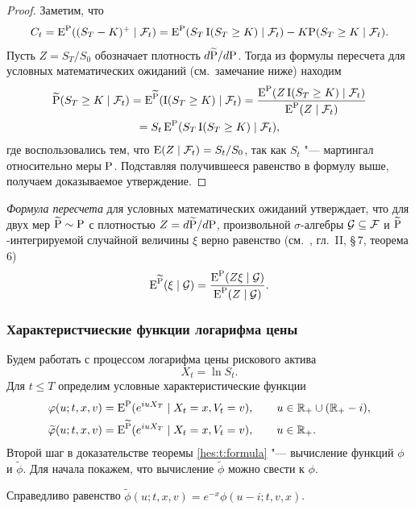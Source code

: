 \begin{proof}
Заметим, что
\[
C_t = \E^\P((S_T - K)^+\mid \F_t) = \E^\P(S_T \I(S_T\ge K) \mid \F_t) - K\P(S_T\ge K\mid \F_t).
\]
Пусть $Z = S_T/S_0$ обозначает плотность $d\tilde\P/d\P$. 
Тогда из формулы пересчета для условных математических ожиданий (см.~замечание ниже) находим
\begin{multline*}
\tilde\P(S_T\ge K\mid \F_t) = \E^{\tilde\P} (\I(S_T \ge K) \mid \F_t)
= \frac{\E^{\P}(Z \I(S_T \ge K)\mid \F_t)}{\E^{\P}(Z\mid \F_t)} \\= S_t \E^{\P}(S_T \I(S_T\ge K)\mid \F_t),
\end{multline*}
где воспользовались тем, что $\E(Z\mid \F_t) = S_t/S_0$, так как $S_t$ "--- мартингал относительно меры $\P$.
Подставляя получившееся равенство в формулу выше, получаем доказываемое утверждение.
\end{proof}

\begin{remark}
\emph{Формула пересчета} для условных математических ожиданий утверждает, что для двух мер $\tilde\P \sim \P$ с плотностью $Z=d\tilde\P/d\P$, произвольной $\sigma$-алгебры $\G\subseteq\F$ и $\tilde\P$-интегрируемой случайной величины $\xi$ верно равенство (см.~\cite{Shiryaev04}, гл.~II, \S\,7, теорема 6)
\[
\E^{\tilde \P}(\xi\mid \G) = \frac{\E^{\P}(Z\xi\mid \G)}{\E^\P(Z\mid \G)}.
\]
\end{remark}


\subsubsection{Характеристчиеские функции логарифма цены}

Будем работать с процессом логарифма цены рискового актива
\[
X_t = \ln S_t.
\]
Для $t\le T$ определим условные характеристические функции
\begin{align*}
&\phi(u; t,x,v) = \E^{\P} (e^{iu X_T} \mid X_t=x, V_t = v), \qquad u\in\R_+ \cup (\R_+-i),\\
&\tilde\phi(u; t,x,v) = \E^{\tilde\P} (e^{iu X_T} \mid X_t=x, V_t = v), \qquad u\in\R_+ .
\end{align*}
Второй шаг в доказательстве теоремы \ref{hes:t:formula} "--- вычисление функций $\phi$ и $\tilde\phi$.
Для начала покажем, что вычисление $\tilde\phi$ можно свести к $\phi$.

\begin{lemma}
Справедливо равенство $\tilde \phi(u; t,x,v) = e^{-x}\phi(u-i;t,v,x)$.
\end{lemma}

